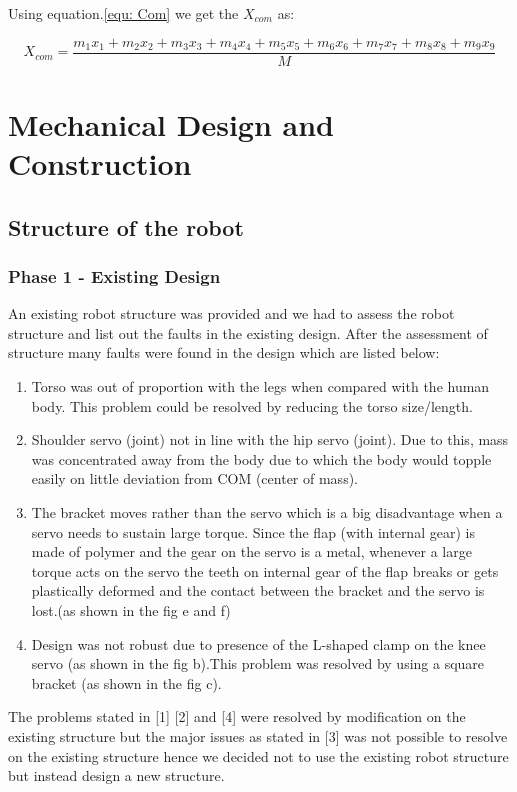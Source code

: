 \documentclass[12pt]{article}
\begin{document}
Using equation.\eqref{equ: Com} we get the $X_{com}$ as:

$$	X_{com} = \frac{m_{1} x_{1} + m_{2} x_{2} + m_{3} x_{3} + m_{4} x_{4} + m_{5} x_{5} + m_{6} x_{6} + m_{7} x_{7} + m_{8} x_{8} + m_{9} x_{9}} {M} $$

\newpage	
\section{Mechanical Design and Construction}
\subsection{Structure of the robot}
\subsubsection{Phase 1 -  Existing Design}
An existing robot structure was provided and we had to assess
the robot structure and list out the faults in the existing design. After the assessment of
structure many faults were found in the design which are listed below:
\begin{enumerate}
	\setlength{\itemsep}{0pt}
	\item Torso was out of proportion with the legs when compared with the human body. This problem could be resolved by reducing the torso size/length.
	\item Shoulder servo (joint) not in line with the hip servo (joint). Due to this, mass was concentrated away from the body due to which the body would topple easily on little deviation from COM (center of mass).   
	\item The bracket moves rather than the servo which is a big disadvantage when a servo needs to sustain large torque. Since the flap (with internal gear) is made of polymer and the gear on the servo is a metal, whenever a large torque acts on the servo the teeth on internal gear of the flap breaks or gets plastically deformed and the contact between the bracket and the servo is lost.(as  shown in the fig e and f)
	\item Design was not robust due to presence of the L-shaped clamp on the knee servo (as shown in the fig b).This problem was resolved by using a square bracket (as shown in the fig c).
\end{enumerate}
The problems stated in [1] [2] and [4] were resolved by modification on the existing
structure but the major issues as stated in [3] was not possible to resolve on the existing
structure hence we decided not to use the existing robot structure but instead design a
new structure.
\end{document}
